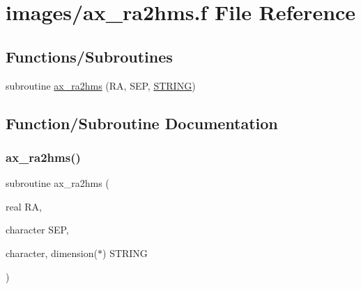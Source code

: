 \hypertarget{ax__ra2hms_8f}{}\section{images/ax\+\_\+ra2hms.f File Reference}
\label{ax__ra2hms_8f}
\subsection*{Functions/\+Subroutines}
\begin{DoxyCompactItemize}
\item 
subroutine \hyperlink{ax__ra2hms_8f_a624c7afc1445b2e10e1b7af5c2cb2fc9}{ax\+\_\+ra2hms} (RA, S\+EP, \hyperlink{eval__tab_8h_a0f4d394a3ab4e09bff60f714c66dc5ee}{S\+T\+R\+I\+NG})
\end{DoxyCompactItemize}


\subsection{Function/\+Subroutine Documentation}
\mbox{\label{ax__ra2hms_8f_a624c7afc1445b2e10e1b7af5c2cb2fc9}} 
\subsubsection{\texorpdfstring{ax\+\_\+ra2hms()}{ax\_ra2hms()}}
{\footnotesize\ttfamily subroutine ax\+\_\+ra2hms (\begin{DoxyParamCaption}\item[{real}]{RA,  }\item[{character}]{S\+EP,  }\item[{character, dimension($\ast$)}]{S\+T\+R\+I\+NG }\end{DoxyParamCaption})}

